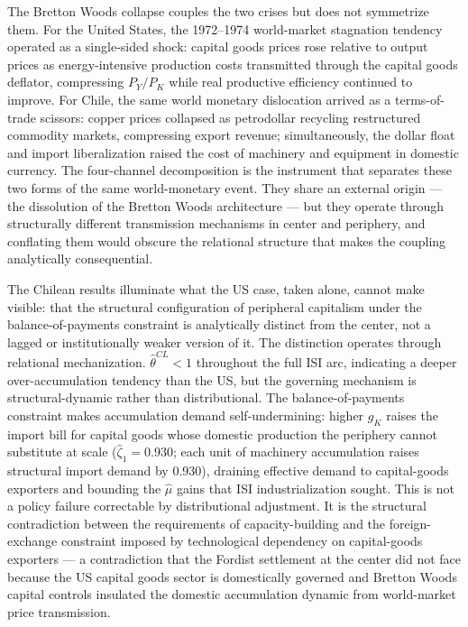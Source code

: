 \documentclass[11pt,a4paper]{article}
\begin{document}
{The Bretton Woods collapse couples the two crises but does not
symmetrize them. For the United States, the 1972--1974 world-market
stagnation tendency operated as a single-sided shock: capital goods
prices rose relative to output prices as energy-intensive production
costs transmitted through the capital goods deflator, compressing
$P_Y/P_K$ while real productive efficiency continued to improve.
For Chile, the same world monetary dislocation arrived as a
terms-of-trade scissors: copper prices collapsed as petrodollar
recycling restructured commodity markets, compressing export revenue;
simultaneously, the dollar float and import liberalization raised
the cost of machinery and equipment in domestic currency. The
four-channel decomposition is the instrument that separates these
two forms of the same world-monetary event. They share an external
origin --- the dissolution of the Bretton Woods architecture ---
but they operate through structurally different transmission
mechanisms in center and periphery, and conflating them would
obscure the relational structure that makes the coupling
analytically consequential.

The Chilean results illuminate what the US case, taken alone, cannot make visible: that the
structural configuration of peripheral capitalism under the
balance-of-payments constraint is analytically distinct from the
center, not a lagged or institutionally weaker version of it. The
distinction operates through relational mechanization.
$\hat{\theta}^{CL} < 1$ throughout the full ISI arc, indicating a
deeper over-accumulation tendency than the US, but the governing
mechanism is structural-dynamic rather than distributional. The
balance-of-payments constraint makes accumulation demand
self-undermining: higher $g_K$ raises the import bill for capital
goods whose domestic production the periphery cannot substitute
at scale ($\hat{\zeta}_1 = 0.930$; each unit of machinery
accumulation raises structural import demand by 0.930), draining
effective demand to capital-goods exporters and bounding the
$\hat{\mu}$ gains that ISI industrialization sought. This is not
a policy failure correctable by distributional adjustment. It is
the structural contradiction between the requirements of
capacity-building and the foreign-exchange constraint imposed by
technological dependency on capital-goods exporters --- a
contradiction that the Fordist settlement at the center did not
face because the US capital goods sector is domestically governed
and Bretton Woods capital controls insulated the domestic
accumulation dynamic from world-market price transmission.

}
\end{document}
